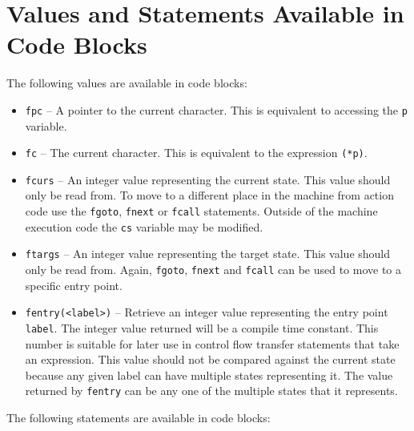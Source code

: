 \documentclass[letterpaper,11pt,oneside]{book}
\begin{document}
\section{Values and Statements Available in Code Blocks}
\label{vals}

\noindent The following values are available in code blocks:

\begin{itemize}
\item \verb|fpc| -- A pointer to the current character. This is equivalent to
accessing the \verb|p| variable.

\item \verb|fc| -- The current character. This is equivalent to the expression \verb|(*p)|.

\item \verb|fcurs| -- An integer value representing the current state. This
value should only be read from. To move to a different place in the machine
from action code use the \verb|fgoto|, \verb|fnext| or \verb|fcall| statements.
Outside of the machine execution code the \verb|cs| variable may be modified.

\item \verb|ftargs| -- An integer value representing the target state. This
value should only be read from. Again, \verb|fgoto|, \verb|fnext| and
\verb|fcall| can be used to move to a specific entry point.

\item \verb|fentry(<label>)| -- Retrieve an integer value representing the
entry point \verb|label|. The integer value returned will be a compile time
constant. This number is suitable for later use in control flow transfer
statements that take an expression. This value should not be compared against
the current state because any given label can have multiple states representing
it. The value returned by \verb|fentry| can be any one of the multiple states that
it represents.
\end{itemize}

\noindent The following statements are available in code blocks:
\end{document}
